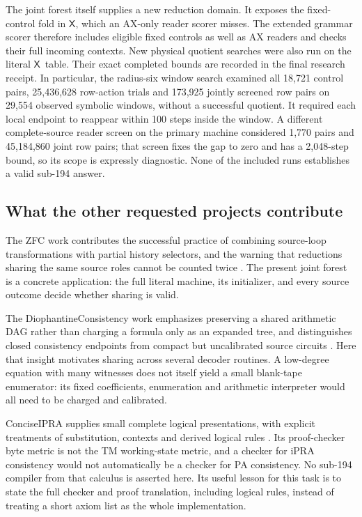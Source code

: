 \documentclass[11pt]{article}
\newcommand{\X}{\ensuremath{\mathsf X}}
\begin{document}
The joint forest itself supplies a new reduction domain. It exposes
the fixed-control fold in \X, which an AX-only reader scorer misses.
The extended grammar scorer therefore includes eligible fixed
controls as well as AX readers and checks their full incoming
contexts. New physical quotient searches were also run on the
literal \X\ table. Their exact completed bounds are recorded in
the final research receipt. In particular, the radius-six window search
examined all 18,721 control pairs, 25,436,628 row-action trials and
173,925 jointly screened row pairs on 29,554 observed symbolic windows,
without a successful quotient. It required each local endpoint to
reappear within 100 steps inside the window. A different complete-source
reader screen on the primary machine considered 1,770 pairs and
45,184,860 joint row pairs; that screen fixes the gap to zero and has
a 2,048-step bound, so its scope is expressly diagnostic. None of the
included runs establishes a valid sub-194 answer.

\subsection{What the other requested projects contribute}

The ZFC work contributes the successful practice of combining
source-loop transformations with partial history selectors, and the
warning that reductions sharing the same source roles cannot be
counted twice \cite{zfc}. The present joint forest is a concrete
application: the full literal machine, its initializer, and every
source outcome decide whether sharing is valid.

The DiophantineConsistency work emphasizes preserving a shared
arithmetic DAG rather than charging a formula only as an expanded
tree, and distinguishes closed consistency endpoints from compact
but uncalibrated source circuits \cite{diophantine}. Here that insight
motivates sharing across several decoder routines. A low-degree
equation with many witnesses does not itself yield a small blank-tape
enumerator: its fixed coefficients, enumeration and arithmetic
interpreter would all need to be charged and calibrated.

ConciseIPRA supplies small complete logical presentations,
with explicit treatments of substitution, contexts and derived
logical rules \cite{concise}. Its proof-checker byte metric is not
the TM working-state metric, and a checker for iPRA consistency
would not automatically be a checker for PA consistency. No
sub-194 compiler from that calculus is asserted here. Its useful
lesson for this task is to state the full checker and proof
translation, including logical rules, instead of treating a short
axiom list as the whole implementation.
\end{document}
